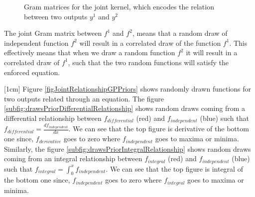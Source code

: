 \begin{figure}[!ht]
  \centering
  \quad
  \caption{Gram matrices for the joint kernel, which encodes the relation between two outputs $y^1$ and $y^2$}
  \label{figGramMatricesJointKernel}
\end{figure}

The joint Gram matrix between \(f^{1}\) and \(f^{2}\), means that a random draw of independent function \(f^{2}\) will result in a correlated draw of the function \(f^{1}\). This effectively means that when we draw a random function \(f^{2}\) it will result in a correlated draw of \(f^{1}\), such that the two random functions will satisfy the enforced equation. 

[1cm]
Figure \ref{figJointRelationshipGPPriors} shows randomly drawn functions for two outputs related through an equation. The figure  \ref{subfig:drawsPriorDifferentialRelationship} shows random draws coming from a differential relationship between \(f_{differential}\) (red) and \(f_{independent}\) (blue) such that \(f_{differential} = \frac{d f_{independent}}{d x}\). We can see that the top figure is derivative of the bottom one since, \(f_{derivative}\) goes to zero where \(f_{independent}\) goes to maxima or minima. Similarly, the figure \ref{subfig:drawsPriorIntegralRelationship} shows random draws coming from an integral relationship between \(f_{integral}\) (red) and \(f_{independent}\) (blue) such that \(f_{integral} = \int_{0}^x f_{independent}\). We can see that the top figure is integral of the bottom one since, \(f_{independent}\) goes to zero where \(f_{integral}\) goes to maxima or minima. 

